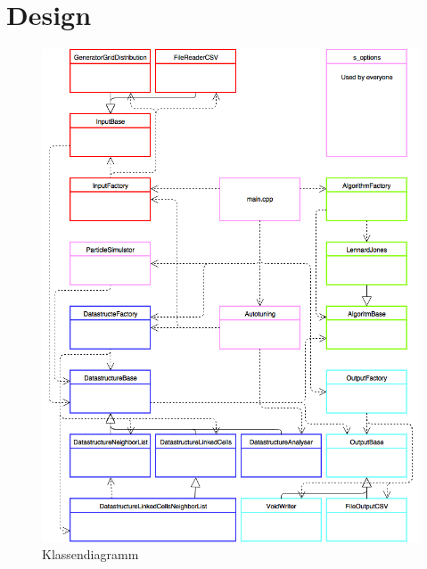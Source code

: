 \documentclass[
	12pt,
	a4paper,
	BCOR10mm,
	DIV14,
	headsepline,
]{scrreprt}
\begin{document}
\section{Design}
\begin{figure}[h]
	\centering
	\includegraphics[height=0.6\textheight]{ClassDiagram.png}
	\caption{Klassendiagramm}
	\label{figure:Klassendiagramm}
\end{figure}
\end{document}
